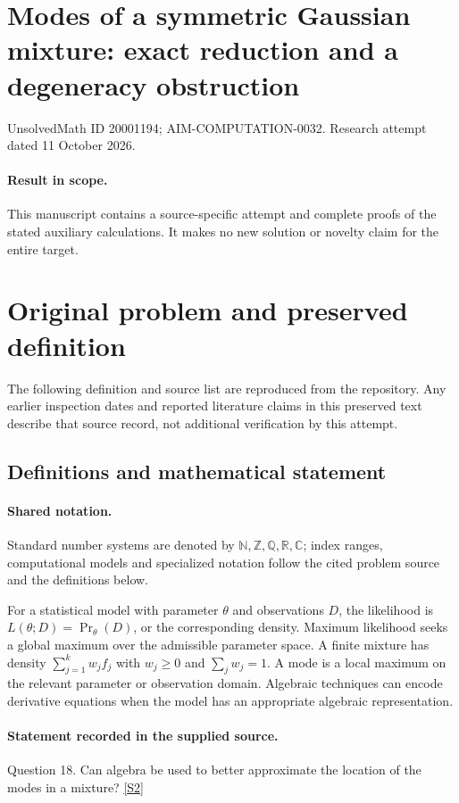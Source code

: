 \documentclass[11pt]{article}
\begin{document}
\section*{Modes of a symmetric Gaussian mixture: exact reduction and a degeneracy obstruction}
\noindent UnsolvedMath ID 20001194; AIM-COMPUTATION-0032. Research attempt dated 11 October 2026.
\paragraph{Result in scope.}This manuscript contains a source-specific attempt and complete proofs of the stated auxiliary calculations. It makes no new solution or novelty claim for the entire target.
\section{Original problem and preserved definition}
The following definition and source list are reproduced from the repository. Any earlier inspection dates and reported literature claims in this preserved text describe that source record, not additional verification by this attempt.
\subsection{Definitions and mathematical statement}

\paragraph{Shared notation.}Standard number systems are denoted by $\mathbb N,\mathbb Z,\mathbb Q,\mathbb R,\mathbb C$; index ranges, computational models and specialized notation follow the cited problem source and the definitions below.


For a statistical model with parameter $\theta$ and observations $D$, the likelihood is $L(\theta;D)=\Pr_\theta(D)$, or the corresponding density. Maximum likelihood seeks a global maximum over the admissible parameter space. A finite mixture has density $\sum_{j=1}^k w_j f_j$ with $w_j\ge0$ and $\sum_j w_j=1$. A mode is a local maximum on the relevant parameter or observation domain. Algebraic techniques can encode derivative equations when the model has an appropriate algebraic representation.
\paragraph{Statement recorded in the supplied source.}
Question 18. Can algebra be used to better approximate the location of the modes in a mixture? \href{https://aimath.org/WWN/compalgstat/compalgstat.pdf}{[S2]}
\end{document}
